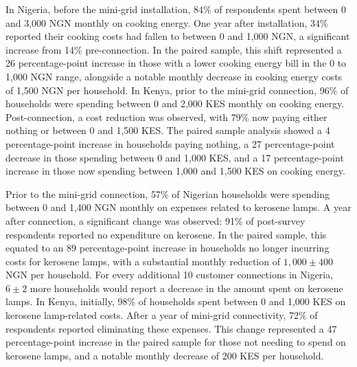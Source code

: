 In Nigeria, before the mini-grid installation, 84\% of respondents spent between 0 and 3,000 NGN monthly on cooking energy. One year after installation, 34\% reported their cooking costs had fallen to between 0 and 1,000 NGN, a significant increase from 14\% pre-connection. In the paired sample, this shift represented a 26 percentage-point increase in those with a lower cooking energy bill in the 0 to 1,000 NGN range, alongside a notable monthly decrease in cooking energy costs of 1,500 NGN per household. In Kenya, prior to the mini-grid connection, 96\% of households were spending between 0 and 2,000 KES monthly on cooking energy. Post-connection, a cost reduction was observed, with 79\% now paying either nothing or between 0 and 1,500 KES. The paired sample analysis showed a 4 percentage-point increase in households paying nothing, a 27 percentage-point decrease in those spending between 0 and 1,000 KES, and a 17 percentage-point increase in those now spending between 1,000 and 1,500 KES on cooking energy.

Prior to the mini-grid connection, 57\% of Nigerian households were spending between 0 and 1,400 NGN monthly on expenses related to kerosene lamps. A year after connection, a significant change was observed: 91\% of post-survey respondents reported no expenditure on kerosene. In the paired sample, this equated to an 89 percentage-point increase in households no longer incurring costs for kerosene lamps, with a substantial monthly reduction of $1,000\pm400$ NGN per household. For every additional 10 customer connections in Nigeria, $6\pm2$ more households would report a decrease in the amount spent on kerosene lamps. In Kenya, initially, 98\% of households spent between 0 and 1,000 KES on kerosene lamp-related costs. After a year of mini-grid connectivity, 72\% of respondents reported eliminating these expenses. This change represented a 47 percentage-point increase in the paired sample for those not needing to spend on kerosene lamps, and a notable monthly decrease of 200 KES per household.